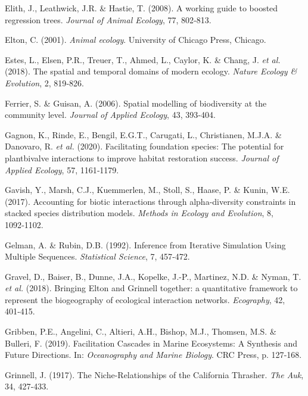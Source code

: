 \documentclass[12pt,]{article}
\newlength{\cslhangindent}
\newenvironment{cslreferences}%
  {\setlength{\parindent}{0pt}%
  \everypar{\setlength{\hangindent}{\cslhangindent}}\ignorespaces}%
  {\par}
\begin{document}
\begin{cslreferences}
\leavevmode\hypertarget{ref-Elith_2008}{}%
Elith, J., Leathwick, J.R. \& Hastie, T. (2008). A working guide to
boosted regression trees. \emph{Journal of Animal Ecology}, 77, 802‑813.

\leavevmode\hypertarget{ref-Elton_2001}{}%
Elton, C. (2001). \emph{Animal ecology}. University of Chicago Press,
Chicago.

\leavevmode\hypertarget{ref-Estes_2018}{}%
Estes, L., Elsen, P.R., Treuer, T., Ahmed, L., Caylor, K. \& Chang, J.
\emph{et al.} (2018). The spatial and temporal domains of modern
ecology. \emph{Nature Ecology \& Evolution}, 2, 819‑826.

\leavevmode\hypertarget{ref-Ferrier_2006}{}%
Ferrier, S. \& Guisan, A. (2006). Spatial modelling of biodiversity at
the community level. \emph{Journal of Applied Ecology}, 43, 393‑404.

\leavevmode\hypertarget{ref-Gagnon_2020}{}%
Gagnon, K., Rinde, E., Bengil, E.G.T., Carugati, L., Christianen, M.J.A.
\& Danovaro, R. \emph{et al.} (2020). Facilitating foundation species:
The potential for plantbivalve interactions to improve habitat
restoration success. \emph{Journal of Applied Ecology}, 57, 1161‑1179.

\leavevmode\hypertarget{ref-Gavish_2017}{}%
Gavish, Y., Marsh, C.J., Kuemmerlen, M., Stoll, S., Haase, P. \& Kunin,
W.E. (2017). Accounting for biotic interactions through alpha-diversity
constraints in stacked species distribution models. \emph{Methods in
Ecology and Evolution}, 8, 1092‑1102.

\leavevmode\hypertarget{ref-Gelman_1992}{}%
Gelman, A. \& Rubin, D.B. (1992). Inference from Iterative Simulation
Using Multiple Sequences. \emph{Statistical Science}, 7, 457‑472.

\leavevmode\hypertarget{ref-Gravel_2018}{}%
Gravel, D., Baiser, B., Dunne, J.A., Kopelke, J.-P., Martinez, N.D. \&
Nyman, T. \emph{et al.} (2018). Bringing Elton and Grinnell together: a
quantitative framework to represent the biogeography of ecological
interaction networks. \emph{Ecography}, 42, 401‑415.

\leavevmode\hypertarget{ref-Gribben_2019}{}%
Gribben, P.E., Angelini, C., Altieri, A.H., Bishop, M.J., Thomsen, M.S.
\& Bulleri, F. (2019). Facilitation Cascades in Marine Ecosystems: A
Synthesis and Future Directions. In: \emph{Oceanography and Marine
Biology}. CRC Press, p. 127‑168.

\leavevmode\hypertarget{ref-Grinnell_1917}{}%
Grinnell, J. (1917). The Niche-Relationships of the California Thrasher.
\emph{The Auk}, 34, 427‑433.


\end{cslreferences}
\end{document}
